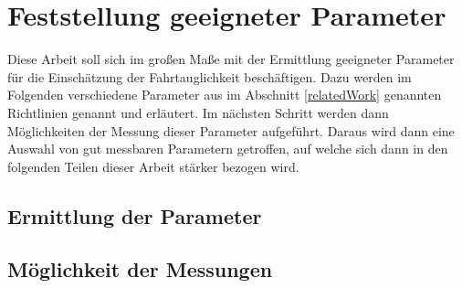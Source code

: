 \section{Feststellung geeigneter Parameter}
\label{parameters}

Diese Arbeit soll sich im großen Maße mit der Ermittlung geeigneter Parameter für die Einschätzung der Fahrtauglichkeit beschäftigen. Dazu werden im Folgenden verschiedene Parameter aus im Abschnitt \ref{relatedWork} genannten Richtlinien genannt und erläutert. Im nächsten Schritt werden dann Möglichkeiten der Messung dieser Parameter aufgeführt. Daraus wird dann eine Auswahl von gut messbaren Parametern getroffen, auf welche sich dann in den folgenden Teilen dieser Arbeit stärker bezogen wird.
\subsection{Ermittlung der Parameter}
\subsection{Möglichkeit der Messungen}
